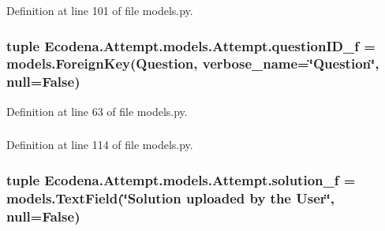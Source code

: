 Definition at line 101 of file models.py.

\hypertarget{class_ecodena_1_1_attempt_1_1models_1_1_attempt_acbd8a4ec39ee2520f9540c23bf78982b}{
\subsubsection[{questionID\_\-f}]{\setlength{\rightskip}{0pt plus 5cm}tuple {\bf Ecodena.Attempt.models.Attempt.questionID\_\-f} = models.ForeignKey({\bf Question}, verbose\_\-name=\char`\"{}Question\char`\"{}, null=False)}}
\label{d5/da0/class_ecodena_1_1_attempt_1_1models_1_1_attempt_acbd8a4ec39ee2520f9540c23bf78982b}


Definition at line 63 of file models.py.

\hypertarget{class_ecodena_1_1_attempt_1_1models_1_1_attempt_a52c7956666bd826ed90d2db15d6f876b}{
\subsubsection[{questionID\_\-f}]{}}
\label{d5/da0/class_ecodena_1_1_attempt_1_1models_1_1_attempt_a52c7956666bd826ed90d2db15d6f876b}


Definition at line 114 of file models.py.

\hypertarget{class_ecodena_1_1_attempt_1_1models_1_1_attempt_a1b63280fe142dfde79c43df974cf42dd}{
\subsubsection[{solution\_\-f}]{\setlength{\rightskip}{0pt plus 5cm}tuple {\bf Ecodena.Attempt.models.Attempt.solution\_\-f} = models.TextField(\char`\"{}Solution uploaded by the User\char`\"{}, null=False)}}
\label{d5/da0/class_ecodena_1_1_attempt_1_1models_1_1_attempt_a1b63280fe142dfde79c43df974cf42dd}


